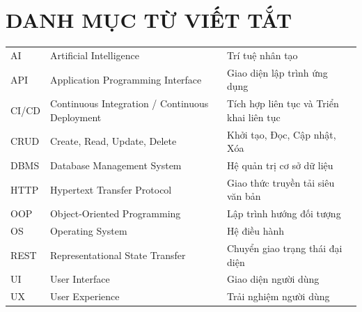 
\chapter*{DANH MỤC TỪ VIẾT TẮT}

\begin{table}[h!]
    \centering
    \begin{tabularx}{\textwidth}{|C{2.8cm}|L{6.2cm}|Y|}
        \hline
         &                              &                  \\ \hline
        AI                   & Artificial Intelligence                        & Trí tuệ nhân tạo                          \\ \hline
        API                  & Application Programming Interface              & Giao diện lập trình ứng dụng              \\ \hline
        CI/CD                & Continuous Integration / Continuous Deployment & Tích hợp liên tục và Triển khai liên tục \\ \hline
        CRUD                 & Create, Read, Update, Delete                   & Khởi tạo, Đọc, Cập nhật, Xóa             \\ \hline
        DBMS                 & Database Management System                     & Hệ quản trị cơ sở dữ liệu                 \\ \hline
        HTTP                 & Hypertext Transfer Protocol                    & Giao thức truyền tải siêu văn bản        \\ \hline
        OOP                  & Object-Oriented Programming                    & Lập trình hướng đối tượng                 \\ \hline
        OS                   & Operating System                               & Hệ điều hành                              \\ \hline
        REST                 & Representational State Transfer                & Chuyển giao trạng thái đại diện          \\ \hline
        UI                   & User Interface                                 & Giao diện người dùng                      \\ \hline
        UX                   & User Experience                                & Trải nghiệm người dùng                    \\ \hline
    \end{tabularx}
\end{table}
